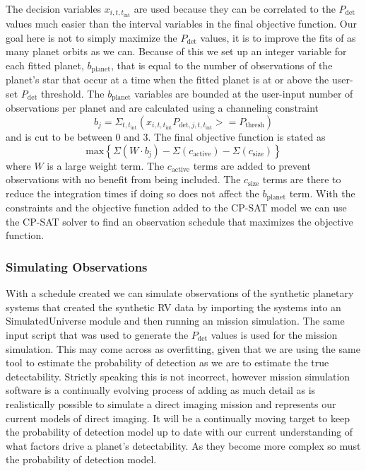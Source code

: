 The decision variables $x_{i, t, t_{\textrm{int}}}$ are used because they can
be correlated to the $P_\textrm{det}$ values much easier than the interval
variables in the final objective function. Our goal here is not to simply
maximize the $P_\textrm{det}$ values, it is to improve the fits of as many
planet orbits as we can. Because of this we set up an integer variable for each
fitted planet, $b_\textrm{planet}$, that is equal to the number of observations
of the planet's star that occur at a time when the fitted planet is at or above
the user-set $P_\textrm{det}$ threshold. The $b_\textrm{planet}$ variables are
bounded at the user-input number of observations per planet and are calculated
using a channeling constraint
\begin{equation}
  b_j = \Sigma_{t, t_\textrm{int}}(x_{i, t, t_\textrm{int}}P_{\textrm{det}, j, t, t_\textrm{int}} >= P_\textrm{thresh})
  \label{eq:bplanet}
\end{equation}
and is cut to be between 0 and 3. The final objective function is stated as 
\begin{equation}
  \textrm{max}{\left\{ \Sigma\left(W \cdot
  b_\textrm{j}\right) - \Sigma\left( c_\textrm{active}\right) - \Sigma\left(
  c_\textrm{size}\right) \right\}}
  \label{eq:final_obj_function}
\end{equation}
where $W$ is a large weight term. The
$c_\textrm{active}$ terms are added to prevent observations with no benefit
from being included. The $c_\textrm{size}$ terms are there to reduce the
integration times if doing so does not affect the $b_\textrm{planet}$ term.
With the constraints and the objective function added to the CP-SAT model we
can use the CP-SAT solver to find an observation schedule that maximizes the
objective function.

\subsubsection{Simulating Observations}

With a schedule created we can simulate observations of the synthetic planetary
systems that created the synthetic RV data by importing the systems into an
 SimulatedUniverse module and then running an 
mission simulation. The same  input script that was used to
generate the $P_\textrm{det}$ values is used for the mission simulation. This
may come across as overfitting, given that we are using the same tool to
estimate the probability of detection as we are to estimate the true
detectability. Strictly speaking this is not incorrect, however mission
simulation software is a continually evolving process of adding as much detail
as is realistically possible to simulate a direct imaging mission and
represents our current models of direct imaging. It will be a continually
moving target to keep the probability of detection model up to date with our
current understanding of what factors drive a planet's detectability. As they
become more complex so must the probability of detection model.


